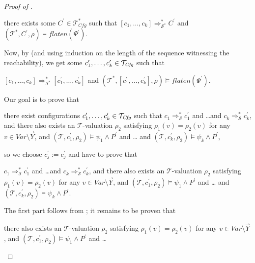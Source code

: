 \begin{proof}[Proof of ]
\begin{enumerate}
    \begin{proofenv}
        there exists some $C^\prime \in \mathcal{T}_{\mathit{Cfg}}^*$ such that
        $[c_1,\ldots,c_k] \Rightarrow_{\mathcal{S}^*}^* C^\prime$
        and $(\mathcal{T}^*, C^\prime, \rho) \vDash \mathit{flaten}(\Psi^\prime)$.
    \end{proofenv}
    Now, by  (and using induction on the length of the
    sequence witnessing the reachability),
    we get some $c^\prime_1,\ldots,c^\prime_k \in \mathcal{T}_{\mathit{Cfg}}$ such that
    \begin{proofenv}
        $[c_1,\ldots,c_k] \Rightarrow_{\mathcal{S}^*}^* [c^\prime_1,\ldots,c^\prime_k]$
        and $(\mathcal{T}^*, [c^\prime_1,\ldots,c^\prime_k], \rho) \vDash \mathit{flaten}(\Psi^\prime)$.
    \end{proofenv}
    Our goal is to prove that
    \begin{proofenv}
        there exist configurations $c_1^\prime,\ldots,c_k^\prime \in \mathcal{T}_{\mathit{Cfg}}$
        such that $c_1 \Rightarrow^{*}_{\mathcal{S}} c_1^\prime$
        and \ldots and $c_k \Rightarrow^{*}_{\mathcal{S}} c_k^\prime$,
        and there also exists an $\mathcal{T}$-valuation $\rho_2$
        satisfying $\rho_1(v) = \rho_2(v)$ for any $v \in \mathit{Var} \setminus \vec{Y}$,
        and
        $(\mathcal{T}, c_1^\prime,\rho_2) \vDash \psi_1 \land P^\prime$ and \ldots
        and $(\mathcal{T}, c_k^\prime, \rho_2) \vDash \psi_k \land P^\prime$,
    \end{proofenv}
    so we choose $c^\prime_j := c^\prime_j$ and have to prove that
    \begin{proofenv}
        $c_1 \Rightarrow^{*}_{\mathcal{S}} c_1^\prime$
        and \ldots and $c_k \Rightarrow^{*}_{\mathcal{S}} c_k^\prime$,
        and there also exists an $\mathcal{T}$-valuation $\rho_2$
        satisfying $\rho_1(v) = \rho_2(v)$ for any $v \in \mathit{Var} \setminus \vec{Y}$,
        and
        $(\mathcal{T}, c_1^\prime,\rho_2) \vDash \psi_1 \land P^\prime$ and \ldots
        and $(\mathcal{T}, c_k^\prime, \rho_2) \vDash \psi_k \land P^\prime$.
    \end{proofenv}
    The first part follows from ;
    it remains to be proven that
    \begin{proofenv}
        there also exists an $\mathcal{T}$-valuation $\rho_2$
        satisfying $\rho_1(v) = \rho_2(v)$ for any $v \in \mathit{Var} \setminus \vec{Y}$,
        and
        $(\mathcal{T}, c_1^\prime,\rho_2) \vDash \psi_1 \land P^\prime$ and \ldots

\end{proofenv}
\end{enumerate}
\end{proof}

